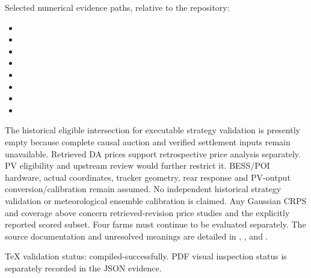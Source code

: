 \documentclass[11pt,a4paper]{article}
\begin{document}
Selected numerical evidence paths, relative to the repository:
\begin{itemize}
\item {}
\item {}
\item {}
\item {}
\item {}
\item {}
\item {}
\item {}
\end{itemize}
The historical eligible intersection for executable strategy validation is presently
empty because complete causal auction and verified settlement inputs remain
unavailable. Retrieved DA prices support retrospective price analysis separately.
PV eligibility and upstream review
would further restrict it. BESS/POI hardware, actual coordinates, tracker geometry,
rear response and PV-output conversion/calibration remain assumed. No independent
historical strategy validation or meteorological ensemble calibration is claimed.
Any Gaussian CRPS and coverage above concern retrieved-revision price studies
and the explicitly reported scored subset. Four farms must continue to be evaluated separately. The source
documentation and unresolved meanings are detailed in ,
,  and .

TeX validation status: compiled-successfully.
PDF visual inspection status is separately recorded in the JSON evidence.


\end{document}
